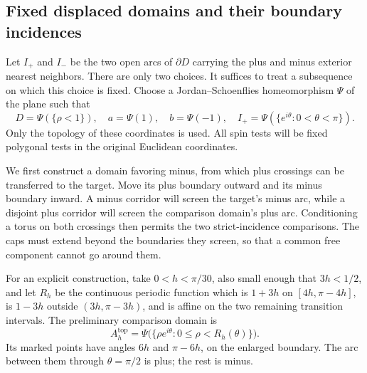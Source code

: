 \subsection{Fixed displaced domains and their boundary incidences}

Let $I_+$ and $I_-$ be the two open arcs of $\partial D$ carrying the plus
and minus exterior nearest neighbors.  There are only two choices.  It
suffices to treat a subsequence on which this choice is fixed.  Choose a
Jordan--Schoenflies homeomorphism $\Psi$ of the plane
\cite[Section~1 and Section~2(A), p.~860]{Cairns1951} such that
\[
 D=\Psi(\{\rho<1\}),\quad
 a=\Psi(1),\quad b=\Psi(-1),\quad
 I_+=\Psi(\{e^{i\theta}:0<\theta<\pi\}).
\]
Only the topology of these coordinates is used.  All spin tests will be
fixed polygonal tests in the original Euclidean coordinates.

We first construct a domain favoring minus, from which plus crossings
can be transferred to the target.  Move its plus boundary outward and
its minus boundary inward.  A minus corridor will screen the target's
minus arc, while a disjoint plus corridor will screen the comparison
domain's plus arc.  Conditioning a torus on both crossings then permits
the two strict-incidence comparisons.  The caps must extend beyond the
boundaries they screen, so that a common free component cannot go
around them.

For an explicit construction, take $0<h<\pi/30$, also small enough that
$3h<1/2$, and let $R_h$ be the continuous periodic
function which is $1+3h$ on $[4h,\pi-4h]$, is $1-3h$ outside
$(3h,\pi-3h)$, and is affine on the two remaining transition intervals.
The preliminary comparison domain is
\begin{equation}
 A_h^{\mathrm{top}}
 =\Psi\bigl(\{\rho e^{i\theta}:0\leq\rho<R_h(\theta)\}\bigr).
 \label{eq:curves-displaced-domain}
\end{equation}
Its marked points have angles $6h$ and $\pi-6h$, on the enlarged boundary.
The arc between them through $\theta=\pi/2$ is plus; the rest is minus.

